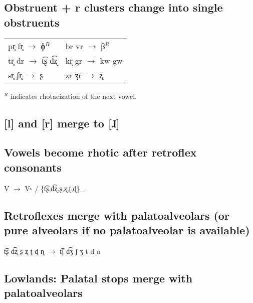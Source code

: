 \documentclass[a4paper,11pt,article,oneside]{memoir}
\newcommand{\bripa}[1]{[#1]}
\newcommand{\bilaf}{ɸ}
\newcommand{\bilav}{β}
\newcommand{\alvlap}{ɺ}
\newcommand{\esh}{ʃ}
\newcommand{\ezh}{ʒ}
\newcommand{\rette}{ʈ}
\newcommand{\retde}{ɖ}
\newcommand{\retesh}{ʂ}
\newcommand{\retezh}{ʐ}
\newcommand{\retna}{ɳ}
\newcommand{\rhot}{˞}
\newcommand{\vless}{̥}
\newcommand{\tiebar}{͡}
\begin{document}
\subsection{Obstruent + r clusters change into single obstruents}

\begin{center}
    \begin{tabular}{ll}
        pr\vless{} fr\vless{} $\to$ \bilaf{}$^{R}$ &
        br vr $\to$ \bilav{}$^{R}$\\[0.1cm]
        tr\vless{} dr $\to$ t\tiebar\retesh{} d\tiebar\retezh &
        kr\vless{} gr $\to$ kw gw \\[0.1cm]
        sr\vless{} \esh r\vless{} $\to$ \retesh &
        zr \ezh r $\to$ \retezh
    \end{tabular}
\end{center}

$^{R}$ indicates rhotacization of the next vowel.

\subsection{\bripa{l} and \bripa{r} merge to \bripa{\alvlap}}

\subsection{Vowels become rhotic after retroflex consonants}

\begin{center}
    V $\to$ V\rhot{} / \{t\tiebar\retesh,d\tiebar\retezh,\retesh,\retezh,\rette,\retde\}\_
\end{center}

\subsection{Retroflexes merge with palatoalveolars (or pure alveolars if no palatoalveolar is available)}

\begin{center}
    t\tiebar\retesh{} d\tiebar\retezh{} \retesh{} \retezh{} \rette{} \retde{} \retna{} $\to$ t\tiebar\esh{} d\tiebar\ezh{} \esh{} \ezh{} t d n
\end{center}

\subsection{{\sc Lowlands:} Palatal stops merge with palatoalveolars}
\end{document}
